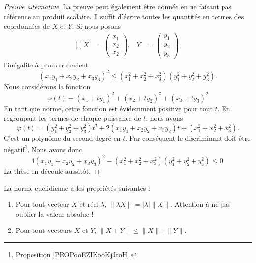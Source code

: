 \begin{proof}[Preuve alternative]
	La preuve peut également être donnée en ne faisant pas référence au produit scalaire. Il suffit d'écrire toutes les quantités en termes des coordonnées de \( X\) et \( Y\). Si nous posons
	\begin{equation}
		\begin{aligned}[]
			X & =\begin{pmatrix}
				x_1 \\
				x_2 \\
				x_2
			\end{pmatrix},
			  & Y                            & =\begin{pmatrix}
				y_1 \\
				y_2 \\
				y_3
			\end{pmatrix},
		\end{aligned}
	\end{equation}
	l'inégalité à prouver devient
	\begin{equation}
		(x_1y_1+x_2y_2+x_3y_3)^2\leq (x_1^2+x_2^2+x_3^2)(y_1^2+y_2^2+y_3^2).
	\end{equation}
	Nous considérons la fonction
	\begin{equation}
		\varphi(t)=(x_1+ty_1)^2+(x_2+ty_2)^2+(x_3+ty_3)^2
	\end{equation}
	En tant que norme, cette fonction est évidemment positive pour tout \( t\). En regroupant les termes de chaque puissance de \( t\), nous avons
	\begin{equation}
		\varphi(t)=(y_1^2+y_2^2+y_3^2)t^2+2(x_1y_1+x_2y_2+x_3y_3)t+(x_1^2+x_2^2+x_3^2).
	\end{equation}
	C'est un polynôme du second degré en \( t\). Par conséquent le discriminant doit être négatif\footnote{Proposition \ref{PROPooEZIKooKjJroH}.}. Nous avons donc
	\begin{equation}
		4(x_1y_1+x_2y_2+x_3y_3)^2-(x_1^2+x_2^2+x_3^2)(y_1^2+y_2^2+y_3^2)\leq 0.
	\end{equation}
	La thèse en découle aussitôt.
\end{proof}

\begin{proposition}     \label{PROPooVSVMooZrqxdc}
	La norme euclidienne a les propriétés suivantes :
	\begin{enumerate}
		\item
		      Pour tout vecteur \( X\) et réel \( \lambda\),  \( \| \lambda X \|=| \lambda |\| X \|\). Attention à ne pas oublier la valeur absolue !
		\item
		      Pour tout vecteurs \( X\) et \( Y\), \( \| X+Y \|\leq \| X \|+\| Y \|\).
	\end{enumerate}
\end{proposition}

